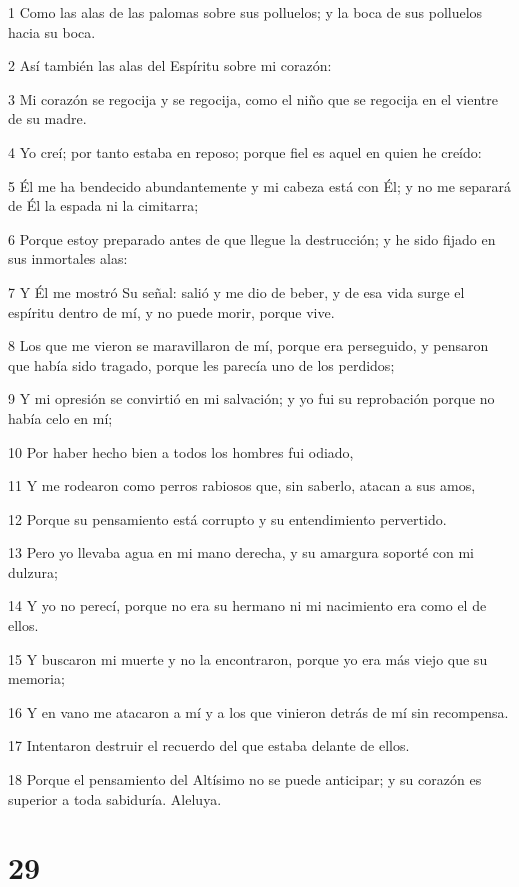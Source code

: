 \par 1 Como las alas de las palomas sobre sus polluelos; y la boca de sus polluelos hacia su boca.
\par 2 Así también las alas del Espíritu sobre mi corazón:
\par 3 Mi corazón se regocija y se regocija, como el niño que se regocija en el vientre de su madre.
\par 4 Yo creí; por tanto estaba en reposo; porque fiel es aquel en quien he creído:
\par 5 Él me ha bendecido abundantemente y mi cabeza está con Él; y no me separará de Él la espada ni la cimitarra;
\par 6 Porque estoy preparado antes de que llegue la destrucción; y he sido fijado en sus inmortales alas:
\par 7 Y Él me mostró Su señal: salió y me dio de beber, y de esa vida surge el espíritu dentro de mí, y no puede morir, porque vive.
\par 8 Los que me vieron se maravillaron de mí, porque era perseguido, y pensaron que había sido tragado, porque les parecía uno de los perdidos;
\par 9 Y mi opresión se convirtió en mi salvación; y yo fui su reprobación porque no había celo en mí;
\par 10 Por haber hecho bien a todos los hombres fui odiado,
\par 11 Y me rodearon como perros rabiosos que, sin saberlo, atacan a sus amos,
\par 12 Porque su pensamiento está corrupto y su entendimiento pervertido.
\par 13 Pero yo llevaba agua en mi mano derecha, y su amargura soporté con mi dulzura;
\par 14 Y yo no perecí, porque no era su hermano ni mi nacimiento era como el de ellos.
\par 15 Y buscaron mi muerte y no la encontraron, porque yo era más viejo que su memoria;
\par 16 Y en vano me atacaron a mí y a los que vinieron detrás de mí sin recompensa.
\par 17 Intentaron destruir el recuerdo del que estaba delante de ellos.
\par 18 Porque el pensamiento del Altísimo no se puede anticipar; y su corazón es superior a toda sabiduría. Aleluya.

\chapter{29}

